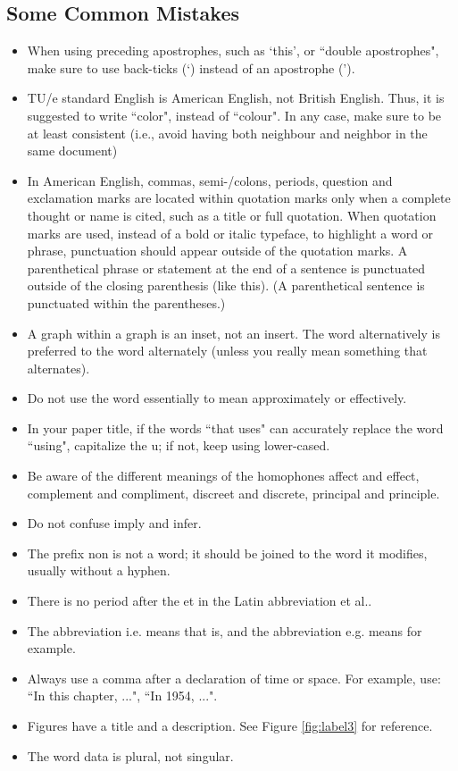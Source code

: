 \documentclass[11pt]{report}
\numberwithin{equation}{chapter}		%
\numberwithin{figure}{chapter}			%
\numberwithin{table}{chapter}			%
\begin{document}
	\subsection{Some Common Mistakes}
	\begin{itemize}
	\item When using preceding apostrophes, such as `this', or ``double apostrophes", make sure to use back-ticks (`) instead of an apostrophe (').
	\item TU/e standard English is American English, not British English. Thus, it is suggested to write ``color", instead of ``colour". In any case, make sure to be at least consistent (i.e., avoid having both neighbour and neighbor in the same document)
	\item In American English, commas, semi-/colons, periods, question and exclamation marks are located within quotation marks only when a complete thought or name is cited, such as a title or full quotation. When quotation marks are used, instead of a bold or italic typeface, to highlight a word or phrase, punctuation should appear outside of the quotation marks. A parenthetical phrase or statement at the end of a sentence is punctuated outside of the closing parenthesis (like this). (A parenthetical sentence is punctuated within the parentheses.)
	\item A graph within a graph is an inset, not an insert. The word alternatively is preferred to the word alternately (unless you really mean something that alternates).
	\item Do not use the word essentially to mean approximately or effectively.
	\item In your paper title, if the words ``that uses" can accurately replace the word ``using", capitalize the u; if not, keep using lower-cased.
	\item Be aware of the different meanings of the homophones affect and effect, complement and compliment, discreet and discrete, principal and principle.
	\item Do not confuse imply and infer.
	\item The prefix non is not a word; it should be joined to the word it modifies, usually without a hyphen.
	\item There is no period after the et in the Latin abbreviation et al..
	\item The abbreviation i.e. means that is, and the abbreviation e.g. means for example.
	\item Always use a comma after a declaration of time or space. For example, use: ``In this chapter, ...", ``In 1954, ...". 
	\item Figures have a title and a description. See Figure \ref{fig:label3} for reference. 
	\item The word data is plural, not singular.

	\end{itemize}
\end{document}
